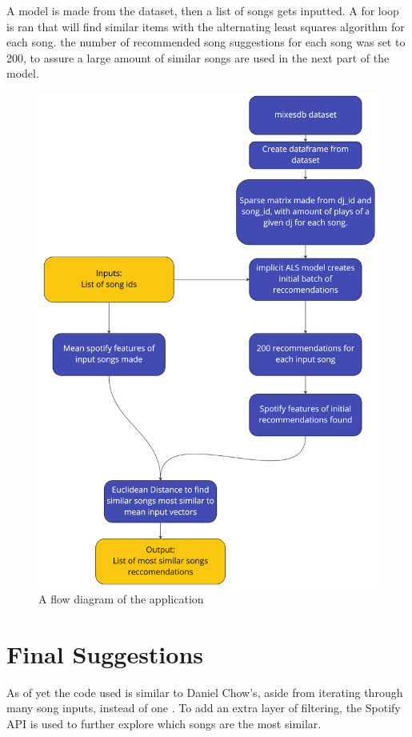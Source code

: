 A model is made from the dataset, then a list of songs gets inputted. A for loop is ran that will find similar items with the alternating least squares algorithm for each song. the number of recommended song suggestions for each song was set to 200, to assure a large amount of similar songs are used in the next part of the model.
\begin{figure}[H]{\noindent\ignorespaces}
	\includegraphics[scale=0.1]{images/application_app_flow}
	\centering
	\caption{A flow diagram of the application} 
\end{figure}

\section{Final Suggestions}
As of yet the code used is similar to Daniel Chow's, aside from iterating through many song inputs, instead of one \citep{chow_music_2020}. To add an extra layer of filtering, the Spotify API is used to further explore which songs are the most similar.

